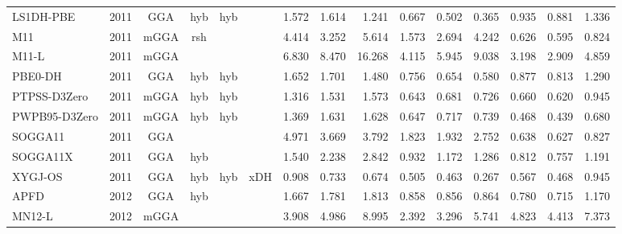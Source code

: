 \begin{landscape}
\begin{longtable}{lcccccrrrrrrrrr}
    LS1DH-PBE        & 2011 & GGA  & hyb      & hyb         &           & 1.572             & 1.614             & 1.241  & 0.667              & 0.502             & 0.365  & 0.935   & 0.881 & 1.336 \\
    M11              & 2011 & mGGA & rsh      &             &           & 4.414             & 3.252             & 5.614  & 1.573              & 2.694             & 4.242  & 0.626   & 0.595 & 0.824 \\
    M11-L            & 2011 & mGGA &          &             &           & 6.830             & 8.470             & 16.268 & 4.115              & 5.945             & 9.038  & 3.198   & 2.909 & 4.859 \\
    PBE0-DH          & 2011 & GGA  & hyb      & hyb         &           & 1.652             & 1.701             & 1.480  & 0.756              & 0.654             & 0.580  & 0.877   & 0.813 & 1.290 \\
    PTPSS-D3Zero     & 2011 & mGGA & hyb      & hyb         &           & 1.316             & 1.531             & 1.573  & 0.643              & 0.681             & 0.726  & 0.660   & 0.620 & 0.945 \\
    PWPB95-D3Zero    & 2011 & mGGA & hyb      & hyb         &           & 1.369             & 1.631             & 1.628  & 0.647              & 0.717             & 0.739  & 0.468   & 0.439 & 0.680 \\
    SOGGA11          & 2011 & GGA  &          &             &           & 4.971             & 3.669             & 3.792  & 1.823              & 1.932             & 2.752  & 0.638   & 0.627 & 0.827 \\
    SOGGA11X         & 2011 & GGA  & hyb      &             &           & 1.540             & 2.238             & 2.842  & 0.932              & 1.172             & 1.286  & 0.812   & 0.757 & 1.191 \\
    XYGJ-OS          & 2011 & GGA  & hyb      & hyb         & xDH       & 0.908             & 0.733             & 0.674  & 0.505              & 0.463             & 0.267  & 0.567   & 0.468 & 0.945 \\
    APFD             & 2012 & GGA  & hyb      &             &           & 1.667             & 1.781             & 1.813  & 0.858              & 0.856             & 0.864  & 0.780   & 0.715 & 1.170 \\
    MN12-L           & 2012 & mGGA &          &             &           & 3.908             & 4.986             & 8.995  & 2.392              & 3.296             & 5.741  & 4.823   & 4.413 & 7.373 \\

\end{longtable}
\end{landscape}

